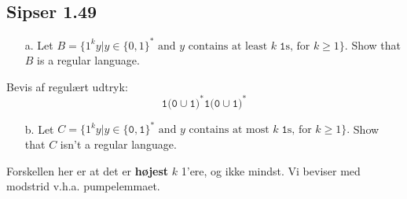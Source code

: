 \subsection{Sipser 1.49}%
\label{subsec:sipser1.49}

\begin{enumerate}
  \item[a.] Let  $B = \{1^{k}y | y \in \{0,1\}^{*} \text{ and } y \text{ contains at least } k \;\mathtt{ 1} \text{s, for } k \ge 1\}$. Show that $B$ is a regular language.
\end{enumerate}

Bevis af regulært udtryk:
\[  \mathtt{1(0} \cup \mathtt{1)}^{*} \mathtt{1(0} \cup \mathtt{1)}^{*} \]

\begin{enumerate}
  \item[b.] Let $C = \{1^{k}y | y \in \{\mathtt{0,1}\}^{*} \text{ and } y \text{ contains at most }k \;\mathtt{1} \text{s, for } k \ge 1\}.$
        Show that $C$ isn't a regular language.
\end{enumerate}

Forskellen her er at det er \textbf{højest} $k$ 1'ere, og ikke mindst.
Vi beviser med modstrid v.h.a. pumpelemmaet.






